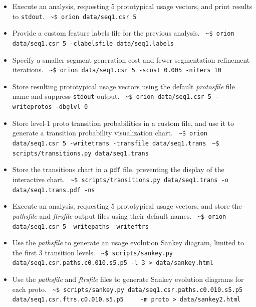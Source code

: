 \documentclass[]{article}
\begin{document}
\begin{itemize}
  \item Execute an \orionp analysis, requesting 5 prototypical usage
  vectors, and print results to {\tt stdout}.\newline
  \verb| ~$ orion data/seq1.csr 5|
  \item Provide a custom feature labels file for the previous analysis.\newline
  \verb| ~$ orion data/seq1.csr 5 -clabelsfile data/seq1.labels|
  \item Specify a smaller segment generation cost and fewer segmentation
  refinement iterations.\newline
  \verb| ~$ orion data/seq1.csr 5 -scost 0.005 -niters 10|
  \item Store resulting prototypical usage vectors using the default
  \emph{protosfile} file name and suppress {\tt stdout} output.\newline
  \verb| ~$ orion data/seq1.csr 5 -writeprotos -dbglvl 0|
  \item Store level-1 proto transition probabilities in a custom file,
  and use it to generate a transition probability visualization
  chart.\newline
  \verb| ~$ orion data/seq1.csr 5 -writetrans -transfile data/seq1.trans|\newline
  \verb| ~$ scripts/transitions.py data/seq1.trans|
  \item Store the transitions chart in a {\tt pdf} file, preventing the
  display of the interactive chart.\newline
  \verb| ~$ scripts/transitions.py data/seq1.trans -o data/seq1.trans.pdf -ns|
  \item Execute an \orionp analysis, requesting 5 prototypical usage
  vectors, and store the \emph{pathsfile} and \emph{ftrsfile} output files
  using their default names.\newline
  \verb| ~$ orion data/seq1.csr 5 -writepaths -writeftrs|
  \item Use the \emph{pathsfile} to generate an usage evolution Sankey
  diagram, limited to the first 3 transition levels.\newline
  \verb| ~$ scripts/sankey.py data/seq1.csr.paths.c0.010.s5.p5 -l 3 > data/sankey.html|
  \item Use the \emph{pathsfile} and \emph{ftrsfile} files to generate Sankey
  evolution diagrams for each proto.\newline
  \verb| ~$ scripts/sankey.py data/seq1.csr.paths.c0.010.s5.p5 data/seq1.csr.ftrs.c0.010.s5.p5|
  \verb|    -m proto > data/sankey2.html|
\end{itemize}
\end{document}
